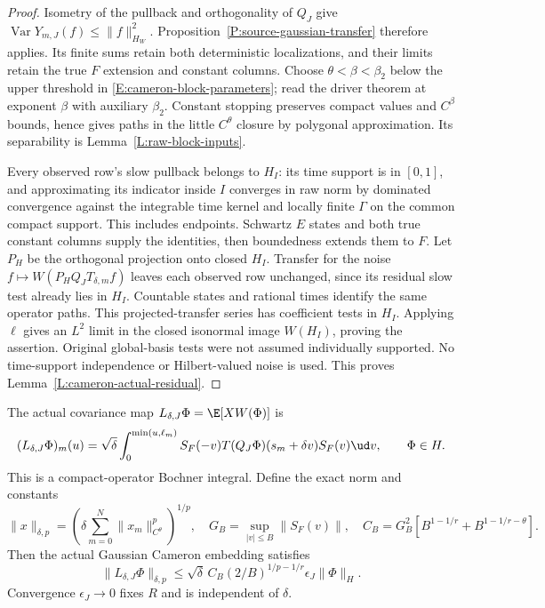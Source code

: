 \begin{proof}
  Isometry of the pullback and orthogonality of $Q_J$ give
  $\operatorname{Var}Y_{m,J}(f)\le\|f\|_{H_W}^2$.
  Proposition~\ref{P:source-gaussian-transfer} therefore applies.
  Its finite sums retain both deterministic localizations, and
  their limits retain the true $F$ extension and constant columns.
  Choose $\theta<\beta<\beta_2$ below the upper threshold in
  \eqref{E:cameron-block-parameters}; read the driver theorem at
  exponent $\beta$ with auxiliary $\beta_2$.
  Constant stopping preserves compact values and $C^\beta$
  bounds, hence gives paths in the little $C^\theta$ closure
  by polygonal approximation.
  Its separability is Lemma~\ref{L:raw-block-inputs}.

  Every observed row's slow pullback belongs to $H_I$:
  its time support is in $[0,1]$, and approximating its indicator
  inside $I$ converges in raw norm by dominated convergence
  against the integrable time kernel and locally finite $\Gamma$
  on the common compact support. This includes endpoints.
  Schwartz $E$ states and both true constant columns supply the
  identities, then boundedness extends them to $F$.
  Let $P_H$ be the orthogonal projection onto closed $H_I$.
  Transfer for the noise $f\mapsto W(P_HQ_JT_{\delta,m}f)$
  leaves each observed row unchanged, since its residual slow
  test already lies in $H_I$. Countable states and rational
  times identify the same operator paths.
  This projected-transfer series has coefficient tests in $H_I$.
  Applying $\ell$ gives an $L^2$ limit in the closed isonormal
  image $W(H_I)$, proving the assertion.
  Original global-basis tests were not assumed individually supported.
  No time-support independence or Hilbert-valued noise is used.
  This proves Lemma~\ref{L:cameron-actual-residual}.
\end{proof}

\begin{proposition}
  \label{P:cameron-actual-embedding}
  The actual covariance map $L_{\delta,J}\Phi=\E[XW(\Phi)]$ is
  \begin{equation}\label{E:cameron-actual-covariance}
    (L_{\delta,J}\Phi)_m(u)=\sqrt\delta
    \int_0^{\min(u,\ell_m)}
    S_F(-v)T(Q_J\Phi)(s_m+\delta v)S_F(v)\ud v ,
    \qquad \Phi\in H.
  \end{equation}
  This is a compact-operator Bochner integral.
  Define the exact norm and constants
  \begin{equation}\label{E:cameron-averaged-norm}
    \|x\|_{\delta,p}
    =\left(\delta\sum_{m=0}^N\|x_m\|_{C^\theta}^p\right)^{1/p},
    \quad G_B=\sup_{|v|\le B}\|S_F(v)\|,
    \quad C_B=G_B^2[B^{1-1/r}+B^{1-1/r-\theta}].
  \end{equation}
  Then the actual Gaussian Cameron embedding satisfies
  \begin{equation}\label{E:cameron-averaged-bound}
    \|L_{\delta,J}\Phi\|_{\delta,p}
    \le\sqrt\delta\,C_B(2/B)^{1/p-1/r}
    \epsilon_J\|\Phi\|_H .
  \end{equation}
  Convergence $\epsilon_J\to0$ fixes $R$ and is independent of $\delta$.
\end{proposition}

